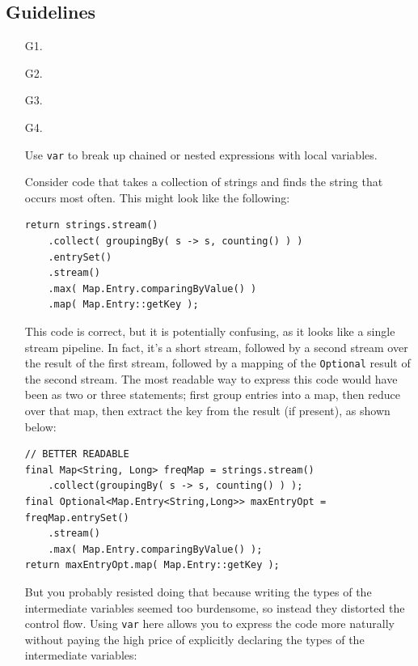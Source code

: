 \documentclass[11pt,a4paper, titlepage, parskip=half, headsepline, footsepline, cleardoublepage=current, headheight=1cm]{scrbook}
\begin{document}
\subsection{Guidelines}
\begin{enumerate}
\item[G1.]{}

\item[G2.]{}

\item[G3.]{}

\item[G4.]{Use \lstinline|var| to break up chained or nested expressions with local variables.

Consider code that takes a collection of strings and finds the string that occurs most often. This might look like the following:
\begin{lstlisting}
return strings.stream()
    .collect( groupingBy( s -> s, counting() ) )
    .entrySet()
    .stream()
    .max( Map.Entry.comparingByValue() )
    .map( Map.Entry::getKey );
\end{lstlisting}

This code is correct, but it is potentially confusing, as it looks like a single stream pipeline. In fact, it’s a short stream, followed by a second stream over the result of the first stream, followed by a mapping of the \lstinline|Optional| result of the second stream. The most readable way to express this code would have been as two or three statements; first group entries into a map, then reduce over that map, then extract the key from the result (if present), as shown below:

\begin{lstlisting}
// BETTER READABLE
final Map<String, Long> freqMap = strings.stream()
    .collect(groupingBy( s -> s, counting() ) );
final Optional<Map.Entry<String,Long>> maxEntryOpt = freqMap.entrySet()
    .stream()
    .max( Map.Entry.comparingByValue() );
return maxEntryOpt.map( Map.Entry::getKey );
\end{lstlisting}

But you probably resisted doing that because writing the types of the intermediate variables seemed too burdensome, so instead they distorted the control flow. Using \lstinline|var| here allows you to express the code more naturally without paying the high price of explicitly declaring the types of the intermediate variables:

}
\end{enumerate}
\end{document}
